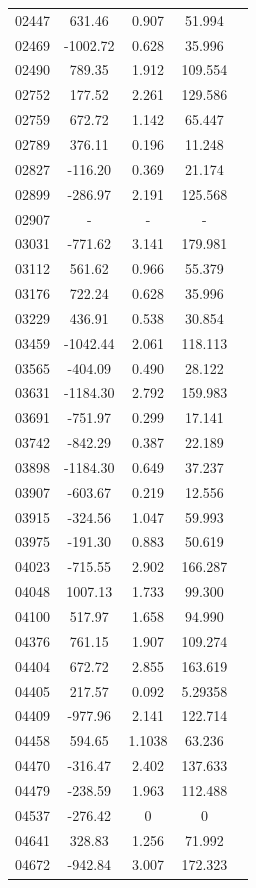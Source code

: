 {\begin{longtable}{ccccc}
02447 & 631.46 & 0.907 & 51.994\\
02469 & -1002.72 & 0.628 & 35.996\\
02490 & 789.35 & 1.912 & 109.554\\
02752 & 177.52 & 2.261 & 129.586\\
02759 & 672.72 & 1.142 & 65.447\\
02789 & 376.11 & 0.196 & 11.248\\
02827 & -116.20 & 0.369 & 21.174\\
02899 & -286.97 & 2.191 & 125.568\\
02907 &       - &     - & - \\
03031 & -771.62 & 3.141 & 179.981\\
03112 & 561.62 & 0.966 & 55.379\\
03176 & 722.24 & 0.628 & 35.996 \\
03229 & 436.91 & 0.538 & 30.854 \\
03459 & -1042.44 & 2.061 & 118.113\\
03565 & -404.09 & 0.490 & 28.122\\
03631 & -1184.30 & 2.792 & 159.983\\
03691 & -751.97 & 0.299 & 17.141\\
03742 & -842.29 & 0.387 & 22.189\\
03898 & -1184.30 & 0.649 & 37.237\\
03907 & -603.67 & 0.219 & 12.556\\
03915 & -324.56 & 1.047 & 59.993\\
03975 & -191.30 & 0.883 & 50.619\\
04023 & -715.55 & 2.902 & 166.287\\
04048 & 1007.13 & 1.733 & 99.300\\
04100 & 517.97 & 1.658 & 94.990\\
04376 & 761.15 & 1.907 & 109.274\\
04404 & 672.72 & 2.855 & 163.619\\
04405 & 217.57 & 0.092 & 5.29358\\
04409 & -977.96 & 2.141 & 122.714\\
04458 & 594.65 & 1.1038 & 63.236\\
04470 & -316.47 & 2.402 & 137.633\\
04479 & -238.59 & 1.963 & 112.488\\
04537 & -276.42 & 0 & 0\\
04641 & 328.83 & 1.256 & 71.992\\
04672 & -942.84 & 3.007 & 172.323\\

\end{longtable}}
